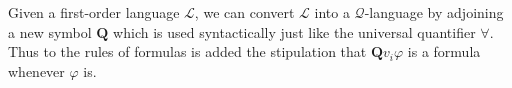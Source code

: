 Given a first-order language $\mathcal{L}$, we can convert $\mathcal{L}$ into a $\mathcal{Q}$-language by adjoining a new symbol $\mathbf{Q}$ which is used syntactically just like the universal quantifier $\forall$. Thus to the rules of formulas is added the stipulation that $\mathbf{Q}v_i\varphi$ is a formula whenever $\varphi$ is.
